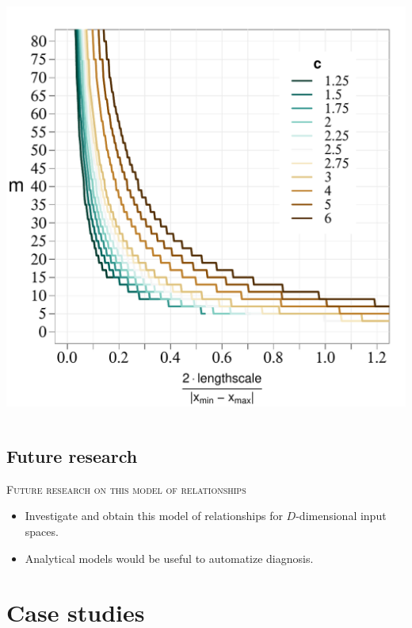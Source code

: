 \documentclass[8pt]{beamer} %
\begin{document}
\begin{frame}
\begin{columns}
\includegraphics[scale=0.28, trim = 0mm 0mm 5mm 10mm, clip]{ch5_fig6_lscale_vs_J_vs_c_zoomin.pdf}
\end{columns}
\end{frame}


\subsection*{Future research}
\begin{frame}

\textsc{\small Future research on this model of relationships}\\[5mm]

\begin{itemize}\setlength\itemsep{3mm}
\item Investigate and obtain this model of relationships for $D$-dimensional input spaces.
\item Analytical models  would be useful to automatize diagnosis.
\end{itemize}
\end{frame}


\section{Case studies}
\end{document}

